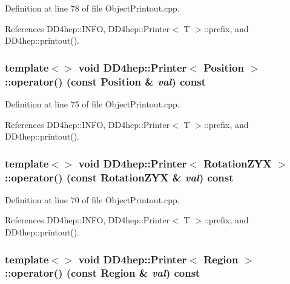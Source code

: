 Definition at line 78 of file ObjectPrintout.cpp.

References DD4hep::INFO, DD4hep::Printer$<$ T $>$::prefix, and DD4hep::printout().\hypertarget{struct_d_d4hep_1_1_printer_a88343bb8ee9c514f04c9f82bce31ae11}{
\subsubsection[{operator()}]{\setlength{\rightskip}{0pt plus 5cm}template$<$$>$ void {\bf DD4hep::Printer}$<$ Position $>$::operator() (const Position \& {\em val}) const}}
\label{struct_d_d4hep_1_1_printer_a88343bb8ee9c514f04c9f82bce31ae11}


Definition at line 75 of file ObjectPrintout.cpp.

References DD4hep::INFO, DD4hep::Printer$<$ T $>$::prefix, and DD4hep::printout().\hypertarget{struct_d_d4hep_1_1_printer_a39503398afc129d7f2bc912e8ebc9324}{
\subsubsection[{operator()}]{\setlength{\rightskip}{0pt plus 5cm}template$<$$>$ void {\bf DD4hep::Printer}$<$ RotationZYX $>$::operator() (const RotationZYX \& {\em val}) const}}
\label{struct_d_d4hep_1_1_printer_a39503398afc129d7f2bc912e8ebc9324}


Definition at line 70 of file ObjectPrintout.cpp.

References DD4hep::INFO, DD4hep::Printer$<$ T $>$::prefix, and DD4hep::printout().\hypertarget{struct_d_d4hep_1_1_printer_a9a184466159682beda92ac777baa0c59}{
\subsubsection[{operator()}]{\setlength{\rightskip}{0pt plus 5cm}template$<$$>$ void {\bf DD4hep::Printer}$<$ {\bf Region} $>$::operator() (const {\bf Region} \& {\em val}) const}}
\label{struct_d_d4hep_1_1_printer_a9a184466159682beda92ac777baa0c59}


